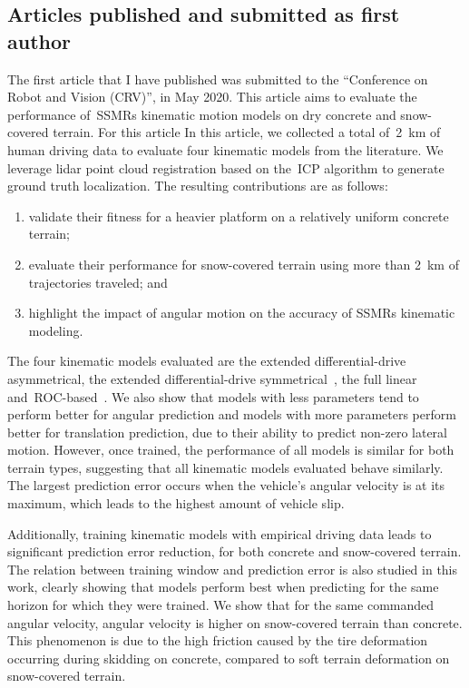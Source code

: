 \subsection{Articles published and submitted as first author}
\begin{center}
	\textbf{}
\end{center}
The first article that I have published was submitted to the ``Conference on Robot and Vision (CRV)'', in May 2020.
This article aims to evaluate the performance of~\acp{SSMR} kinematic motion models on dry concrete and snow-covered terrain.
For this article
In this article, we collected a total of~\SI{2}{\kilo\meter} of human driving data to evaluate four kinematic models from the literature.
We leverage lidar point cloud registration based on the~\ac{ICP} algorithm to generate ground truth localization.
The resulting contributions are as follows:
\begin{enumerate}
	\item validate their fitness for a heavier platform on a relatively uniform concrete terrain;
	\item evaluate their performance for snow-covered terrain using more than \SI{2}{\kilo\meter} of trajectories traveled; and
	\item highlight the impact of angular motion on the accuracy of \acp{SSMR} kinematic modeling.
\end{enumerate}

The four kinematic models evaluated are the extended differential-drive asymmetrical, the extended differential-drive symmetrical~\citep{Mandow2007}, the full linear~\citep{Anousaki2004} and~\ac{ROC}-based~\citep{Wang2015}.
We also show that models with less parameters tend to perform better for angular prediction and models with more parameters perform better for translation prediction, due to their ability to predict non-zero lateral motion.
However, once trained, the performance of all models is similar for both terrain types, suggesting that all kinematic models evaluated behave similarly.
The largest prediction error occurs when the vehicle's angular velocity is at its maximum, which leads to the highest amount of vehicle slip.

Additionally, training kinematic models with empirical driving data leads to significant prediction error reduction, for both concrete and snow-covered terrain.
The relation between training window and prediction error is also studied in this work, clearly showing that models perform best when predicting for the same horizon for which they were trained.
We show that for the same commanded angular velocity, angular velocity is higher on snow-covered terrain than concrete. 
This phenomenon is due to the high friction caused by the tire deformation occurring during skidding on concrete, compared to soft terrain deformation on snow-covered terrain.

